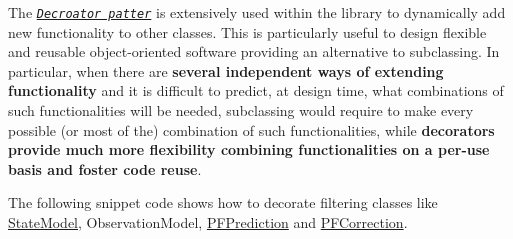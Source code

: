 The \href{https://en.wikipedia.org/wiki/Decorator_pattern}{\tt {\itshape Decroator patter}} is extensively used within the library to dynamically add new functionality to other classes. This is particularly useful to design flexible and reusable object-\/oriented software providing an alternative to subclassing. In particular, when there are {\bfseries several independent ways of extending functionality} and it is difficult to predict, at design time, what combinations of such functionalities will be needed, subclassing would require to make every possible (or most of the) combination of such functionalities, while {\bfseries decorators provide much more flexibility combining functionalities on a per-\/use basis and foster code reuse}.~\newline


The following snippet code shows how to decorate filtering classes like \mbox{\hyperlink{classbfl_1_1StateModel}{State\+Model}}, Observation\+Model, \mbox{\hyperlink{classbfl_1_1PFPrediction}{P\+F\+Prediction}} and \mbox{\hyperlink{classbfl_1_1PFCorrection}{P\+F\+Correction}}.


